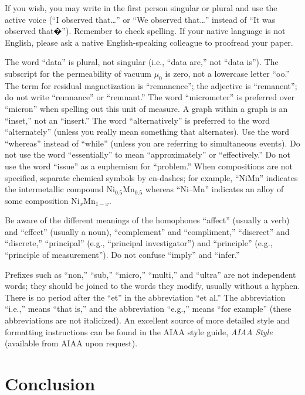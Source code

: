 \documentclass{aiaa-tc}%
\begin{document}
If you wish, you may write in the first person singular or plural and
use the active voice (``I observed that\ldots'' or ``We observed that\ldots''
instead of ``It was observed that�'').
Remember to check spelling.
If your native language is not English, please ask a native
English-speaking colleague to proofread your paper.

The word ``data'' is plural, not singular (i.e., ``data are,'' not ``data
is'').
The subscript for the permeability of vacuum $\mu_0$ is zero, not a
lowercase letter ``oo.''
The term for residual magnetization is ``remanence''; the adjective is
``remanent''; do not write ``remnance'' or ``remnant.''
The word ``micrometer'' is preferred over ``micron'' when spelling out
this unit of measure.
A graph within a graph is an ``inset,'' not an ``insert.''
The word ``alternatively'' is preferred to the word ``alternately''
(unless you really mean something that alternates).
Use the word ``whereas'' instead of ``while'' (unless you are referring
to simultaneous events).
Do not use the word ``essentially'' to mean ``approximately'' or
``effectively.''
Do not use the word ``issue'' as a euphemism for ``problem.''
When compositions are not specified, separate chemical symbols by
en-dashes; for example, ``NiMn'' indicates the intermetallic compound
Ni$_{0.5}$Mn$_{0.5}$ whereas ``Ni--Mn'' indicates an alloy of some
composition Ni$_{x}$Mn$_{1-x}$.

Be aware of the different meanings of the homophones ``affect'' (usually
a verb) and ``effect'' (usually a noun), ``complement'' and
``compliment,'' ``discreet'' and ``discrete,'' ``principal'' (e.g.,
``principal investigator'') and ``principle'' (e.g., ``principle of
measurement''). Do not confuse ``imply'' and ``infer.''

Prefixes such as ``non,'' ``sub,'' ``micro,'' ``multi,'' and ``ultra''
are not independent words; they should be joined to the words they
modify, usually without a hyphen.
There is no period after the ``et'' in the abbreviation ``et al.''
The abbreviation ``i.e.,'' means ``that is,'' and the abbreviation
``e.g.,'' means ``for example'' (these abbreviations are not
italicized).
An excellent source of more detailed style and formatting instructions
can be found in the AIAA style guide, {\it AIAA Style} (available from AIAA
upon request).

\section{Conclusion}
\end{document}
